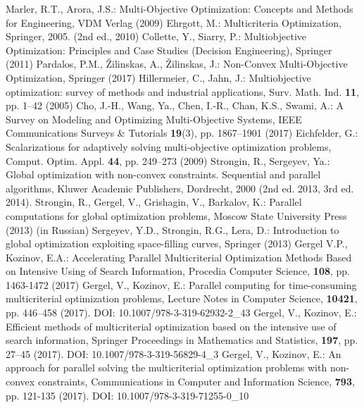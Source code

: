 \documentclass[runningheads]{llncs}
\begin{document}
\begin{thebibliography}{8}

 Marler, R.T., Arora, J.S.: Multi-Objective Optimization: Concepts and Methods for Engineering,  VDM Verlag  (2009)
 Ehrgott, M.: Multicriteria Optimization,  Springer, 2005. (2nd ed., 2010)
 Collette, Y., Siarry, P.: Multiobjective Optimization: Principles and Case Studies (Decision Engineering),  Springer (2011)
 Pardalos, P.M., {\v Z}ilinskas, A., {\v Z}ilinskas, J.: Non-Convex Multi-Objective Optimization,  Springer (2017)
 Hillermeier, C., Jahn, J.: Multiobjective optimization: survey of methods and industrial applications,  Surv. Math. Ind. \textbf{11}, pp. 1--42 (2005)
 Cho, J.-H., Wang, Ya., Chen, I.-R., Chan, K.S., Swami, A.: A Survey on Modeling and Optimizing Multi-Objective Systems,  IEEE Communications Surveys {\&} Tutorials \textbf{19}(3), pp. 1867--1901 (2017) 
	Eichfelder, G.: Scalarizations for adaptively solving multi-objective optimization problems,  Comput. Optim. Appl. \textbf{44}, pp. 249--273 (2009) 
	Strongin, R., Sergeyev, Ya.: Global optimization with non-convex constraints. Sequential and parallel algorithms,  Kluwer Academic Publishers, Dordrecht, 2000 (2nd ed. 2013, 3rd ed. 2014).
	Strongin, R., Gergel, V., Grishagin, V., Barkalov, K.: Parallel computations for global optimization problems,  Moscow State University Press (2013) (in Russian)
	Sergeyev, Y.D., Strongin, R.G., Lera, D.: Introduction to global optimization exploiting space-filling curves,  Springer (2013)
	Gergel V.P., Kozinov, E.A.: Accelerating Parallel Multicriterial Optimization Methods Based on Intensive Using of Search Information,  Procedia Computer Science, \textbf{108}, pp. 1463-1472 (2017)
	Gergel, V., Kozinov, E.: Parallel computing for time-consuming multicriterial optimization problems,  Lecture Notes in Computer Science, \textbf{10421}, pp. 446--458 (2017).  DOI: 10.1007/978-3-319-62932-2\_43
	Gergel, V., Kozinov, E.: Efficient methods of multicriterial optimization based on the intensive use of search information,  Springer Proceedings in Mathematics and Statistics, \textbf{197}, pp. 27--45 (2017). DOI: 10.1007/978-3-319-56829-4\_3
	Gergel, V., Kozinov, E.: An approach for parallel solving the multicriterial optimization problems with non-convex constraints,  Communications in Computer and Information Science, \textbf{793}, pp. 121-135 (2017). DOI: 10.1007/978-3-319-71255-0\_10

\end{thebibliography}
\end{document}
